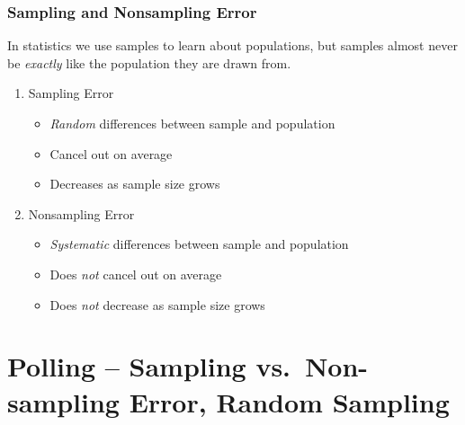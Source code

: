 \begin{frame}
\frametitle{Sampling and Nonsampling Error}
In statistics we use samples to learn about populations, but samples almost never be \emph{exactly} like the population they are drawn from.
	\begin{enumerate}
		\item Sampling Error 
			\begin{itemize}
				\item \emph{Random} differences between sample and population
				\item Cancel out on average
				\item Decreases as sample size grows
			\end{itemize}
		\item Nonsampling Error
			\begin{itemize}
				\item \emph{Systematic} differences between sample and population 
				\item Does \emph{not} cancel out on average
				\item Does \emph{not} decrease as sample size grows
			\end{itemize}
	\end{enumerate}
\end{frame}



\section{Polling -- Sampling vs.\ Non-sampling Error, Random Sampling}

